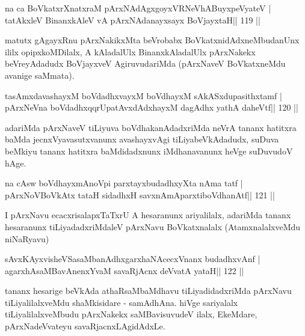 \begin{shl}
na ca BoVkatxrXnatxraM pArxNAdAgxgoyxVRNeVhABuyxpeVyateV |
tatAkxleV BinanxkAleV vA pArxNAdanayxsayx BoVjayxtaH\hfill || 119 ||
\end{shl}

\begin{artha}
matutx gAgayxRnu pArxNakikxMta beVrobabx BoVkatxnidAdxneMbudanUnx ililx  opipxkoMDilalx, A kAladalUlx BinanxkAladalUlx pArxNakekx beVreyAdadudx BoVjayxveV AgiruvudariMda (pArxNaveV BoVkatxneMdu avanige saMmata).
\end{artha}

\begin{shl}
tasAmxdavashayxM boVdadhxvayxM boVdhayxM sAkASxdupasithxtamf |
pArxNeVna boVdadhxqqrUpatAvxdAdxhayxM dagAdhx yathA daheVtf\hfill || 120 ||
\end{shl}

\begin{artha}
adariMda pArxNaveV tiLiyuva boVdhakanAdadxriMda neVrA tananx hatitxra  baMda jecnxVyavasutxvanunx avashayxvAgi tiLiyabeVkAdadudx, suDuva beMkiyu tananx hatitxra baMdidadxnunx iMdhanavanunx heVge suDuvudoV hAge.
\end{artha}

\begin{shl}
na cAsw boVdhayxmAnoV\s pi parxtayxbudadhxyXta nAma tatf |
pArxNoV\s BoVkAtx tataH sidadhxH savxnAmAparxtiboVdhanAtf\hfill || 121 ||
\end{shl}

\begin{artha}
I pArxNavu ecacxrisalapxTaTxrU A hesaranunx ariyalilalx, adariMda tananx hesaranunx tiLiyadadxriMdaleV pArxNavu BoVkatxnalalx (AtamxnalalxveMdu niNaRyavu)
\end{artha}

\begin{shl}
sAvxKAyxvisheVSasaMbanAdhxgarxhaNAcecxVnanx budadhxvAnf |
agarxhAsaMBavAnenxYvaM savaRjAcnx deVvatA yataH\hfill || 122 ||
\end{shl}

\begin{artha}
tananx hesarige beVkAda athaRsaMbaMdhavu tiLiyadidadxriMda pArxNavu  tiLiyalilalx\-veMdu shaMkisidare - samAdhAna. hiVge sariyalalx  tiLiyalilalxveMbudu pArxNakekx saMBavisuvudeV ilalx, EkeMdare, pArxNadeVvateyu savaRjacnxLAgidAdxLe.
\end{artha}


